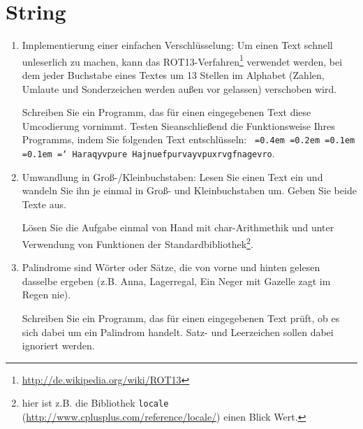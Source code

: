 \documentclass[paper=a4, fontsize=11pt, twoside]{scrartcl}
\newcommand*\justify{%
  \fontdimen2\font=0.4em%
  \fontdimen3\font=0.2em%
  \fontdimen4\font=0.1em%
  \fontdimen7\font=0.1em%
  \hyphenchar\font=`\-%
}
\begin{document}
\section*{String}
\begin{enumerate}[resume]
  \item Implementierung einer einfachen Verschlüsselung: Um einen Text schnell unleserlich zu machen, kann das ROT13-Verfahren\footnote{\url{http://de.wikipedia.org/wiki/ROT13}} verwendet werden, bei dem jeder Buchstabe eines Textes um 13 Stellen im Alphabet (Zahlen, Umlaute und Sonderzeichen werden außen vor gelassen) verschoben wird. \par
Schreiben Sie ein Programm, das für einen eingegebenen Text diese Umcodierung vornimmt. Testen Sieanschließend die Funktionsweise Ihres Programms, indem Sie folgenden Text entschlüsseln:  \glqq \texttt{\justify Haraqyvpure Hajnuefpurvayvpuxrvgfnagevro}\grqq. 
  \item Umwandlung in Groß-/Kleinbuchstaben: Lesen Sie einen Text ein und wandeln Sie ihn je einmal in Groß- und Kleinbuchstaben um. Geben Sie beide Texte aus. \par Lösen Sie die Aufgabe einmal von Hand mit char-Arithmethik und unter Verwendung von Funktionen der Standardbibliothek\footnote{hier ist z.B. die Bibliothek \glqq \texttt{locale}\grqq\, (\url{http://www.cplusplus.com/reference/locale/}) einen Blick Wert.}.
  \item Palindrome sind Wörter oder Sätze, die von vorne und hinten gelesen dasselbe ergeben (z.B. Anna, Lagerregal, Ein Neger mit Gazelle zagt im Regen nie). 
\par Schreiben Sie ein Programm, das für einen eingegebenen Text prüft, ob es sich dabei um ein Palindrom handelt. Satz- und Leerzeichen sollen dabei ignoriert werden.
\end{enumerate}
\end{document}
